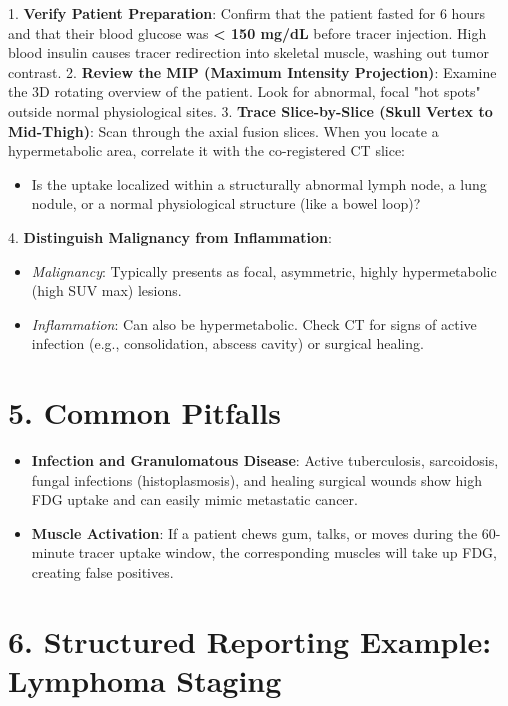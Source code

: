 1. \textbf{Verify Patient Preparation}: Confirm that the patient fasted for 6 hours and that their blood glucose was \textbf{< 150 mg/dL} before tracer injection. High blood insulin causes tracer redirection into skeletal muscle, washing out tumor contrast.
2. \textbf{Review the MIP (Maximum Intensity Projection)}: Examine the 3D rotating overview of the patient. Look for abnormal, focal "hot spots" outside normal physiological sites.
3. \textbf{Trace Slice-by-Slice (Skull Vertex to Mid-Thigh)}: Scan through the axial fusion slices. When you locate a hypermetabolic area, correlate it with the co-registered CT slice:
\begin{itemize}
    \item Is the uptake localized within a structurally abnormal lymph node, a lung nodule, or a normal physiological structure (like a bowel loop)?
\end{itemize}
4. \textbf{Distinguish Malignancy from Inflammation}: 
\begin{itemize}
    \item \textit{Malignancy}: Typically presents as focal, asymmetric, highly hypermetabolic (high SUV max) lesions.
    \item \textit{Inflammation}: Can also be hypermetabolic. Check CT for signs of active infection (e.g., consolidation, abscess cavity) or surgical healing.
\end{itemize}


\section*{5. Common Pitfalls}
\begin{itemize}
    \item \textbf{Infection and Granulomatous Disease}: Active tuberculosis, sarcoidosis, fungal infections (histoplasmosis), and healing surgical wounds show high FDG uptake and can easily mimic metastatic cancer.
    \item \textbf{Muscle Activation}: If a patient chews gum, talks, or moves during the 60-minute tracer uptake window, the corresponding muscles will take up FDG, creating false positives.
\end{itemize}


\section*{6. Structured Reporting Example: Lymphoma Staging}


